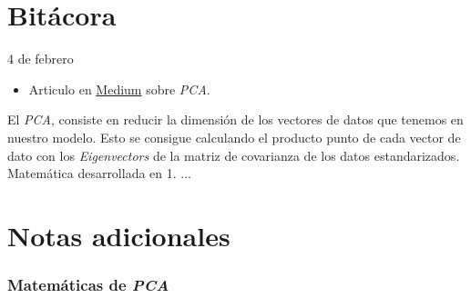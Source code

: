 
\maketitle

\part{Bitácora}
\begin{entry}{4 de febrero}
\tcbsubtitle{\LBlimportant}
\begin{itemize}
    \item Articulo en \href{https://medium.com/codex/principal-component-analysis-pca-how-it-works-mathematically-d5de4c7138e6}{Medium} sobre \textit{PCA}.
\end{itemize}
\tcblower
\tcbsubtitle{\LBlsummary}
El \textit{PCA}, consiste en reducir la dimensión de los vectores de datos que tenemos en nuestro modelo. Esto se consigue calculando el producto punto de cada vector de dato con los \textit{Eigenvectors} de la matriz de covarianza de los datos estandarizados. Matemática desarrollada en 1.
\vspace{0.4em}
\tcbsubtitle{\LBltodo}
...
\end{entry}

\newpage

\part{Notas adicionales}
\section{Matemáticas de \textit{PCA}}
